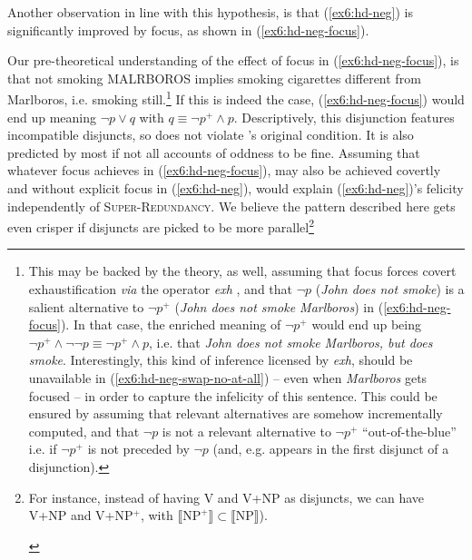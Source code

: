 Another observation in line with this hypothesis, is that (\ref{ex6:hd-neg}) is significantly improved by focus, as shown in (\ref{ex6:hd-neg-focus}). 


\begin{exe}
	\label{ex6:hd-neg-focus}
\end{exe}

Our pre-theoretical understanding of the effect of focus in (\ref{ex6:hd-neg-focus}), is that not smoking MALRBOROS implies smoking cigarettes different from Marlboros, i.e. smoking still.\footnote{\label{fn:exh-marlboros}This may be backed by the theory, as well, assuming that focus forces covert exhaustification \textit{via} the operator \textit{exh} \citep{Fox2007,Chierchia2009}, and that $\neg p$ (\textit{John does not smoke}) is a salient alternative to $\neg p^+$ (\textit{John does not smoke Marlboros}) in (\ref{ex6:hd-neg-focus}). In that case, the enriched meaning of $\neg p^+$ would end up being $\neg p^+ \wedge \neg\neg p \equiv \neg p^+ \wedge p$, i.e. that \textit{John does not smoke Marlboros, but does smoke}. Interestingly, this kind of inference licensed by \textit{exh}, should be unavailable in (\ref{ex6:hd-neg-swap-no-at-all}) -- even when \textit{Marlboros} gets focused -- in order to capture the infelicity of this sentence. This could be ensured by assuming that relevant alternatives are somehow incrementally computed, and that $\neg p$ is not a relevant alternative to $\neg p^+$ ``out-of-the-blue'' i.e. if $\neg p^+$ is not preceded by $\neg p$ (and, e.g. appears in the first disjunct of a disjunction).} If this is indeed the case, (\ref{ex6:hd-neg-focus}) would end up meaning $\neg p \vee q$ with $q \equiv \neg p^+ \wedge p$. Descriptively, this disjunction features incompatible disjuncts, so does not violate \citeauthor{Hurford1974}'s original condition. It is also predicted by most if not all accounts of oddness to be fine. Assuming that whatever focus achieves in (\ref{ex6:hd-neg-focus}), may also be achieved covertly and without explicit focus in (\ref{ex6:hd-neg}), would explain (\ref{ex6:hd-neg})'s felicity independently of \textsc{Super-Redundancy}. We believe the pattern described here gets even crisper if disjuncts are picked to be more parallel\footnote{For instance, instead of having V and V+NP as disjuncts, we can have V+NP and V+NP$^+$, with $\llbracket \text{NP}^+\rrbracket \subset \llbracket \text{NP}\rrbracket$).
	\begin{exe}

\end{exe}}
